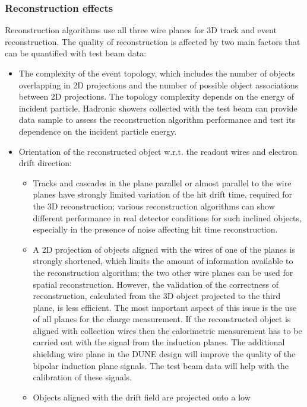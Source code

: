 
\subsubsection{Reconstruction effects}
\label{sec_reco}

Reconstruction algorithms use all three wire planes for 3D track and event reconstruction. The quality of reconstruction is affected by two main factors that can be quantified with test beam data:
\begin{itemize}
\item The complexity of the event topology, which includes the number of objects overlapping in 2D projections and the number of possible object associations between 2D projections. The topology complexity depends on the energy of incident particle. Hadronic showers collected with the test beam can provide data sample to assess the reconstruction algorithm performance and test its dependence on the incident particle energy.
\item Orientation of the reconstructed object w.r.t. the readout wires and electron drift direction:
\begin{itemize}
\item Tracks and cascades in the plane parallel or almost parallel to the wire planes have strongly limited variation of the hit drift time, required for the 3D reconstruction; various reconstruction algorithms can show different performance in real detector conditions for such inclined objects, especially in the presence of noise affecting hit time reconstruction.
\item A 2D projection of objects aligned with the wires of one of the planes is strongly shortened, which limits the amount of information available to the reconstruction algorithm; the two other wire planes can be used for spatial reconstruction.  However, the validation of the correctness of reconstruction, calculated from the 3D object projected to the third plane, is less efficient.
The most important aspect of this issue is the use of all planes for the charge measurement. If the reconstructed object is aligned with collection wires then the calorimetric measurement has to be carried out with the signal from the induction planes. The additional shielding wire plane in the DUNE design will improve the quality of the bipolar induction plane signals.  The test beam 
data will help with the calibration of these signals.
\item Objects aligned with the drift field are projected onto a low

\end{itemize}
\end{itemize}
